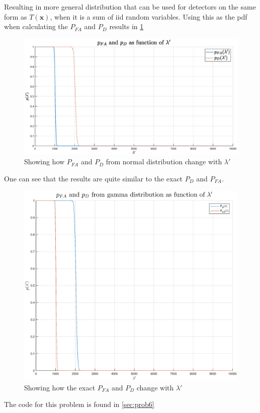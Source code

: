 Resulting in more general distribution that can be used for detectors on the same form as $T(\mathbf{x})$, when it is a sum of iid random variables. Using this as the pdf when calculating the $P_{FA}$ and $P_D$ results in \ref{fig:pfavspdaslambda}
\begin{figure}
    \centering
    \includegraphics[width=\textwidth]{figures/gauss_lambda_pfa_pd.eps}
    \caption{Showing how $P_{FA}$ and $P_D$ from normal distribution change with $\lambda'$}
    \label{fig:pfavspdaslambda}
\end{figure}

One can see that the results are quite similar to the exact $P_{D}$ and $P_{FA}$.

\begin{figure}
    \centering
    \includegraphics[width=\textwidth]{figures/p-d-fa-gauss.eps}
    \caption{Showing how the exact $P_{FA}$ and $P_D$ change with $\lambda'$}
    \label{fig:exactpdpfa}
\end{figure}
The code for this problem is found in \ref{sec:prob6}
\newpage

